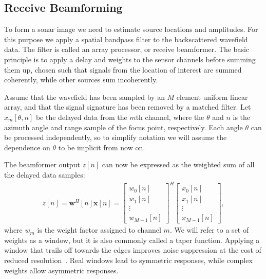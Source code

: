 \documentclass[10pt,journal,draftclsnofoot,onecolumn]{IEEEtran}
\newcommand\bmat[1]{\begin{bmatrix}#1\end{bmatrix}}
\renewcommand\H{^{\scriptscriptstyle H}}
\renewcommand\vec[1]{\boldsymbol{#1}}
\newcommand\1{\vec 1}
\newcommand*\w{\vec w}
\newcommand*\x{\vec x}
\begin{document}
% 
% 


\newpage
\subsection{Receive Beamforming}

To form a sonar image we need to estimate source locations and amplitudes. For this purpose we apply a spatial bandpass filter to the backscattered wavefield data. The filter is called an array processor, or receive beamformer. The basic principle is to apply a delay and weights to the sensor channels before summing them up, chosen such that signals from the location of interest are summed coherently, while other sources sum incoherently.

Assume that the wavefield has been sampled by an $M$ element uniform linear array, and that the signal signature has been removed by a matched filter. Let $x_m[\theta,n]$ be the delayed data from the $m$th channel, where the $\theta$ and $n$ is the azimuth angle and range sample of the focus point, respectively. Each angle $\theta$ can be processed independently, so to simplify notation we will assume the dependence on $\theta$ to be implicit from now on. 

The beamformer output $z[n]$ can now be expressed as the weighted sum of all the delayed data samples:
\begin{align}
z[n] = \w\H[n]\x[n] = \bmat{w_0[n]\\w_1[n]\\\vdots\\w_{M-1}[n]}^H \bmat{x_0[n]\\x_1[n]\\\vdots\\x_{M-1}[n]},\label{z}
\end{align}
where $w_m$ is the weight factor assigned to channel $m$. We will refer to a set of weights as a window, but it is also commonly called a taper function. Applying a window that trails off towards the edges improves noise suppression at the cost of reduced resolution~\cite{Harris1978}. Real windows lead to symmetric responses, while complex weights allow asymmetric responses.
\end{document}
